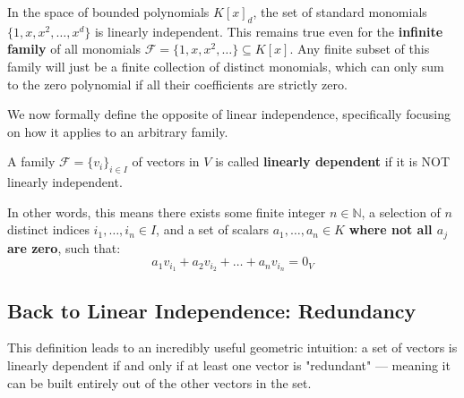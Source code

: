 \begin{example}
In the space of bounded polynomials $K[x]_d$, the set of standard monomials $\{1, x, x^2, \dots, x^d\}$ is linearly independent. This remains true even for the \textbf{infinite family} of all monomials $\mathcal{F} = \{1, x, x^2, \dots\} \subseteq K[x]$. Any finite subset of this family will just be a finite collection of distinct monomials, which can only sum to the zero polynomial if all their coefficients are strictly zero.
\end{example}

We now formally define the opposite of linear independence, specifically focusing on how it applies to an arbitrary family.

\begin{definition}
A family $\mathcal{F} = \{v_i\}_{i \in I}$ of vectors in $V$ is called \textbf{linearly dependent} if it is NOT linearly independent. 

In other words, this means there exists some finite integer $n \in \mathbb{N}$, a selection of $n$ distinct indices $i_1, \dots, i_n \in I$, and a set of scalars $a_1, \dots, a_n \in K$ \textbf{where not all $a_j$ are zero}, such that:
\[
a_1 v_{i_1} + a_2 v_{i_2} + \dots + a_n v_{i_n} = 0_V
\]
\end{definition}

\subsection{Back to Linear Independence: Redundancy}

This definition leads to an incredibly useful geometric intuition: a set of vectors is linearly dependent if and only if at least one vector is "redundant" — meaning it can be built entirely out of the other vectors in the set. 

\begin{center}
\end{center}

